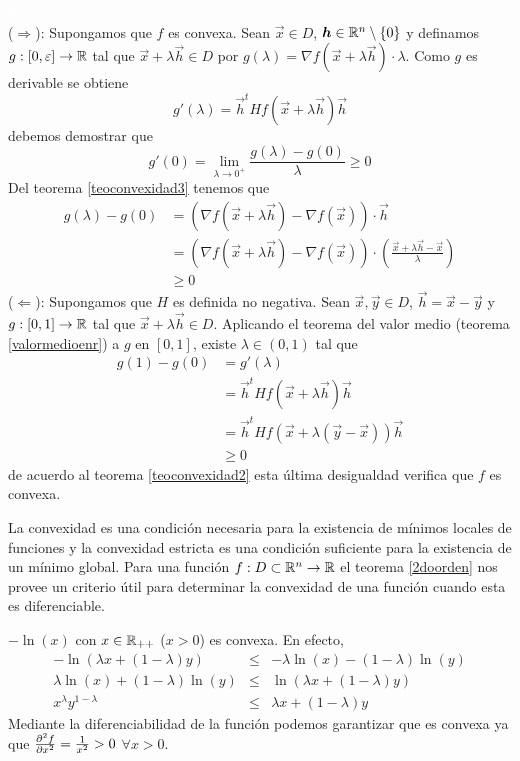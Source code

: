 \begin{demostracion}
\textcolor{white}{linea en blanco}
\\($\Rightarrow$): Supongamos que $f$ es convexa. Sean $\vec{x}\in D$, $\boldsymbol{h}\in \mathbb{R}^n\setminus\{0\}$ y definamos $g:[0,\varepsilon]\to \mathbb{R}$ tal que $\vec{x}+\lambda \vec{h} \in D$ por $g(\lambda)=\nabla f(\vec{x}+\lambda \vec{h})\cdot\lambda$. Como $g$ es derivable se obtiene
$$g'(\lambda)=\vec{h}^t Hf(\vec{x}+\lambda \vec{h})\vec{h}$$
debemos demostrar que 
$$g'(0)=\lim_{\lambda \to 0^+} \frac{g(\lambda)-g(0)}{\lambda}\geq 0$$
Del teorema \ref{teoconvexidad3} tenemos que
\begin{align*}
g(\lambda)-g(0) &= (\nabla f(\vec{x}+\lambda \vec{h})-\nabla f(\vec{x}))\cdot \vec{h} \\
                &= (\nabla f(\vec{x}+\lambda \vec{h})-\nabla f(\vec{x}))\cdot \left(\frac{\vec{x}+\lambda \vec{h} -\vec{x}}{\lambda}\right) \\
                &\geq 0  
\end{align*}
($\Leftarrow$): Supongamos que $H$ es definida no negativa. Sean $\vec{x},\vec{y} \in D$, $\vec{h}=\vec{x}-\vec{y}$ y $g:[0,1]\to \mathbb{R}$ tal que $\vec{x}+\lambda \vec{h} \in D$. Aplicando el teorema del valor medio (teorema \ref{valormedioenr}) a $g$ en $[0,1]$, existe $\lambda \in (0,1)$ tal que
\begin{align*}
g(1)-g(0) &= g'(\lambda) \\
          &= \vec{h}^t Hf(\vec{x}+\lambda \vec{h})\vec{h} \\
          &= \vec{h}^t Hf(\vec{x}+\lambda (\vec{y}-\vec{x}))\vec{h} \\
          &\geq 0
\end{align*}
de acuerdo al teorema \ref{teoconvexidad2} esta \'ultima desigualdad verifica que $f$ es convexa. 
\end{demostracion}

La convexidad es una condici\'on necesaria para la existencia de m\'inimos locales de funciones y la convexidad estricta es una condici\'on suficiente para la existencia de un m\'inimo global. Para una funci\'on $f: D\subset \mathbb{R}^n \to \mathbb{R}$ el teorema \ref{2doorden} nos provee un criterio \'util para determinar la convexidad de una funci\'on cuando esta es diferenciable.

\begin{ejemplo}\label{ejemploconvexidad}
$-\ln(x)$ con $x\in \mathbb{R}_{++}$ ($x>0$) es convexa. En efecto,
\begin{eqnarray*}
-\ln(\lambda x + (1-\lambda)y)      &\leq & -\lambda \ln(x) - (1-\lambda)\ln(y) \\
\lambda \ln(x) + (1-\lambda)\ln(y)  &\leq &  \ln(\lambda x + (1-\lambda)y) \\
x^{\lambda} y^{1-\lambda}           &\leq &  \lambda x + (1-\lambda)y \label{eqec}
\end{eqnarray*}
Mediante la diferenciabilidad de la funci\'on podemos garantizar que es convexa ya que $\frac{\partial ^2f}{\partial x^2}=\frac{1}{x^2}>0$ $\forall x>0$.
\end{ejemplo}

